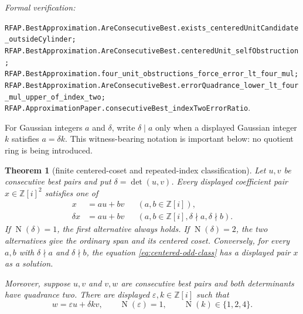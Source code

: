 \documentclass[11pt]{article}
\newtheorem{theorem}{Theorem}[section]
\newcommand{\Zi}{\mathbb{Z}[i]}
\newcommand{\Norm}[1]{\operatorname{N}\!\left(#1\right)}
\newcommand{\leanref}[1]{\par\smallskip\noindent
  \emph{Formal verification:}\par\nobreak
  {\raggedright\nolinkurl{#1}.\par}}
\begin{document}
\leanref{RFAP.BestApproximation.AreConsecutiveBest.exists_centeredUnitCandidate_outsideCylinder;
RFAP.BestApproximation.AreConsecutiveBest.centeredUnit_selfObstruction;
RFAP.BestApproximation.four_unit_obstructions_force_error_lt_four_mul;
RFAP.BestApproximation.AreConsecutiveBest.errorQuadrance_lower_lt_four_mul_upper_of_index_two;
RFAP.ApproximationPaper.consecutiveBest_indexTwoErrorRatio}

For Gaussian integers $a$ and $\delta$, write $\delta\mid a$ only when a
displayed Gaussian integer $k$ satisfies $a=\delta k$.  This witness-bearing
notation is important below: no quotient ring is being introduced.

\begin{theorem}[finite centered-coset and repeated-index classification]
\label{thm:finite-centered-coset}
Let $u,v$ be consecutive best pairs and put $\delta=\det(u,v)$.  Every
displayed coefficient pair $x\in\Zi^2$ satisfies one of
\begin{align}
 x&=a u+b v &&(a,b\in\Zi),
 \label{eq:centered-integral-class}\\
 \delta x&=a u+b v &&(a,b\in\Zi, \delta\nmid a, \delta\nmid b).
 \label{eq:centered-odd-class}
\end{align}
If $\Norm\delta=1$, the first alternative always holds.  If
$\Norm\delta=2$, the two alternatives give the ordinary span and its
centered coset.  Conversely, for every $a,b$ with
$\delta\nmid a$ and $\delta\nmid b$, the equation
\eqref{eq:centered-odd-class} has a displayed pair $x$ as a solution.

Moreover, suppose $u,v$ and $v,w$ are consecutive best pairs and both
determinants have quadrance two.  There are displayed
$\varepsilon,k\in\Zi$ such that
\begin{equation}
\label{eq:repeated-index-normal-form}
          w=\varepsilon u+\delta k v,
          \qquad \Norm\varepsilon=1,
          \qquad \Norm k\in\{1,2,4\}.
\end{equation}
\end{theorem}
\end{document}
